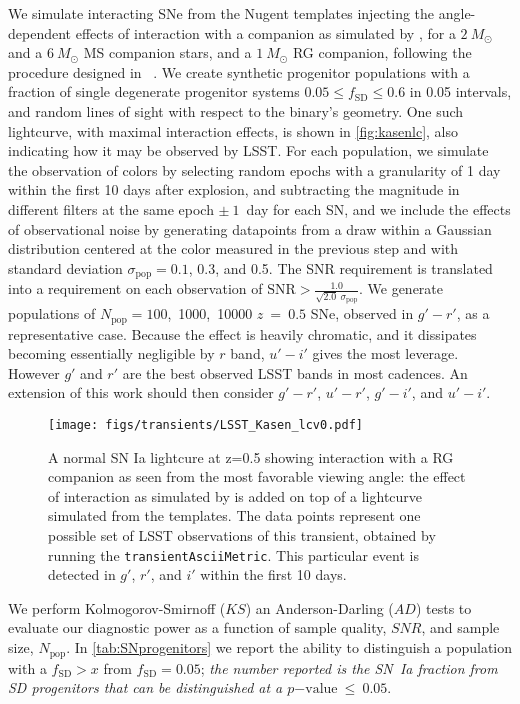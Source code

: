 We simulate interacting SNe from the Nugent templates \citep{Nugent02}
injecting the angle-dependent effects of interaction with a companion
as simulated by \citep{Kasen10}, for a $2~M_\odot$ and a $6~M_\odot$
MS companion stars, and a $1~M_\odot$ RG companion, following the
procedure designed in ~\citep{Bianco11}. We create synthetic progenitor
populations with a fraction of single degenerate progenitor systems
$0.05 \leq f_\mathrm{SD} \leq 0.6 $ in 0.05 intervals, and random lines of
sight with respect to the binary's geometry. One such lightcurve, with
maximal interaction effects, is shown in \autoref{fig:kasenlc}, also
indicating how it may be observed by LSST. For each population, we
simulate the observation of colors by selecting random epochs with a
granularity of 1 day within the first 10 days after explosion, and
subtracting the magnitude in different filters at the same epoch
$\pm~1$~day for each SN, and we include the effects of observational
noise by generating datapoints from a draw within a Gaussian
distribution centered at the color measured in the previous step and
with standard deviation $\sigma_\mathrm{pop} = 0.1$, 0.3, and 0.5.
The SNR requirement is
translated into a requirement on each
observation of $\mathrm{SNR} >
\frac{1.0}{\sqrt{2.0}~\sigma_\mathrm{pop}}$.
We generate populations of $N_\mathrm{pop}=100$,~1000,~10000 $z~=~0.5$ SNe,
observed in $g'-r'$, as a representative case. Because the effect is
heavily chromatic, and it dissipates becoming essentially negligible
by $r$ band, $u'-i'$ gives the most leverage. However $g'$ and $r'$
are the best observed LSST bands in most cadences. An extension of
this work should then consider $g'-r'$, $u'-r'$, $g'-i'$, and $u'-i'$.

\begin{figure}[hbt]
\centerline{
\texttt{[image: figs/transients/LSST\_Kasen\_lcv0.pdf]}
}
\caption{ A normal SN Ia lightcure at z=0.5 showing interaction with a
  RG companion as seen from the most favorable viewing angle: the
  effect of interaction as simulated by \citet{Kasen10} is added on
  top of a lightcurve simulated from the \citealt{Nugent02}
  templates. The data points represent one possible set of LSST
  observations of this transient, obtained by running the
  \texttt{transientAsciiMetric}.  This particular event is detected in
  $g'$, $r'$, and $i'$ within the first 10 days.}
\label{fig:kasenlc}
\end{figure}

We perform Kolmogorov-Smirnoff ($KS$) an Anderson-Darling ($AD$) tests
to evaluate our diagnostic power as a function of sample quality,
$SNR$, and sample size, $N_\mathrm{pop}$.  In
\autoref{tab:SNprogenitors} we report the ability to distinguish a
population with a $f_\mathrm{SD} > x$ from $f_\mathrm{SD}=0.05$; \emph{the
number reported is the SN~Ia fraction from SD progenitors that can be
distinguished at a $p\mathrm{-value}~\leq ~0.05$}.

